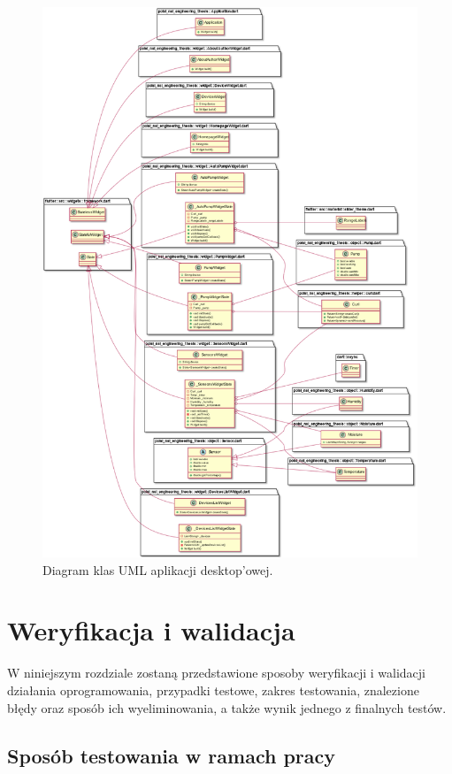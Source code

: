 \documentclass[a4paper,twoside,12pt]{book}
\begin{document}
\begin{figure}[H]
   \centering
   \includegraphics[width=\textwidth]{./assets/img/img022.png}
   \caption{Diagram klas UML aplikacji desktop'owej.}
   \label{fig:22}
\end{figure}

\chapter{Weryfikacja i walidacja}

W niniejszym rozdziale zostaną przedstawione sposoby weryfikacji i walidacji działania oprogramowania, przypadki testowe, zakres testowania, znalezione błędy oraz sposób ich wyeliminowania, a także wynik jednego z finalnych testów.

\section{Sposób testowania w ramach pracy}
\end{document}
